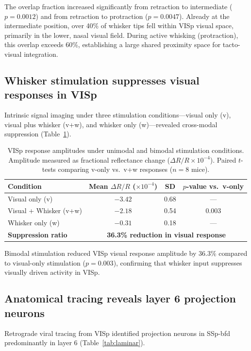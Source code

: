 \documentclass[11pt]{article}
\begin{document}
The overlap fraction increased significantly from retraction to intermediate ($p = 0.0012$) and from retraction to protraction ($p = 0.0047$). Already at the intermediate position, over 40\% of whisker tips fell within VISp visual space, primarily in the lower, nasal visual field. During active whisking (protraction), this overlap exceeds 60\%, establishing a large shared proximity space for tacto-visual integration.

\subsection{Whisker stimulation suppresses visual responses in VISp}

Intrinsic signal imaging under three stimulation conditions---visual only (v), visual plus whisker (v+w), and whisker only (w)---revealed cross-modal suppression (Table~\ref{tab:suppression}).

\begin{table}[H]
\centering
\caption{VISp response amplitudes under unimodal and bimodal stimulation conditions. Amplitude measured as fractional reflectance change ($\Delta R/R \times 10^{-4}$). Paired $t$-tests comparing v-only vs.\ v+w responses ($n = 8$ mice).}
\label{tab:suppression}
\begin{tabular}{lccc}
\toprule
\textbf{Condition} & \textbf{Mean $\Delta R/R$ ($\times 10^{-4}$)} & \textbf{SD} & \textbf{$p$-value vs.\ v-only} \\
\midrule
Visual only (v) & $-3.42$ & 0.68 & --- \\
Visual + Whisker (v+w) & $-2.18$ & 0.54 & 0.003 \\
Whisker only (w) & $-0.31$ & 0.18 & --- \\
\textbf{Suppression ratio} & \multicolumn{3}{c}{\textbf{36.3\% reduction in visual response}} \\
\bottomrule
\end{tabular}
\end{table}

Bimodal stimulation reduced VISp visual response amplitude by 36.3\% compared to visual-only stimulation ($p = 0.003$), confirming that whisker input suppresses visually driven activity in VISp.

\subsection{Anatomical tracing reveals layer 6 projection neurons}

Retrograde viral tracing from VISp identified projection neurons in SSp-bfd predominantly in layer 6 (Table~\ref{tab:laminar}).
\end{document}
